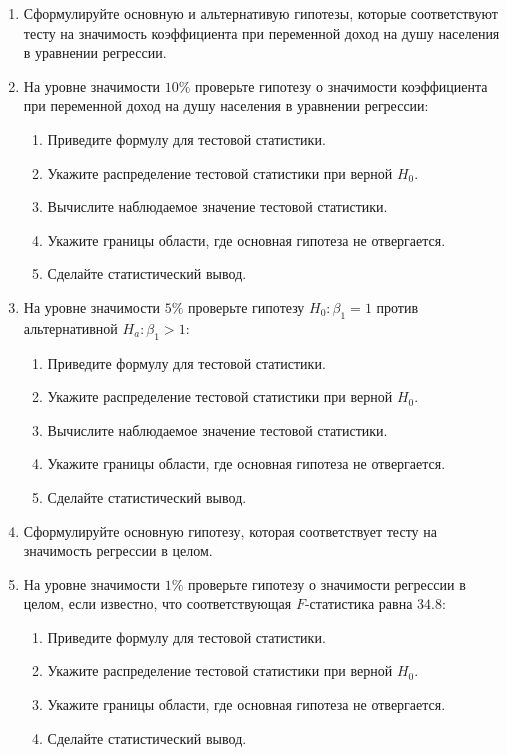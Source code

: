 \begin{problem}
\begin{enumerate}
\item Сформулируйте основную и альтернативую гипотезы, которые соответствуют тесту на значимость коэффициента при переменной доход на душу населения в уравнении регрессии.
\item На уровне значимости $10\%$ проверьте гипотезу о значимости коэффициента при переменной доход на душу населения в уравнении регрессии:
\begin{enumerate}
\item Приведите формулу для тестовой статистики.
\item Укажите распределение тестовой статистики при верной $H_0$.
\item Вычислите наблюдаемое значение тестовой статистики.
\item Укажите границы области, где основная гипотеза не отвергается.
\item Сделайте статистический вывод.
\end{enumerate}
\item На уровне значимости $5\%$ проверьте гипотезу $H_0: \beta_1 = 1$ против альтернативной $H_a: \beta_1 > 1$:
\begin{enumerate}
\item Приведите формулу для тестовой статистики.
\item Укажите распределение тестовой статистики при верной $H_0$.
\item Вычислите наблюдаемое значение тестовой статистики.
\item Укажите границы области, где основная гипотеза не отвергается.
\item Сделайте статистический вывод.
\end{enumerate}
\item Сформулируйте основную гипотезу, которая соответствует тесту на значимость регрессии в целом.
\item На уровне значимости $1\%$ проверьте гипотезу о значимости регрессии в целом, если известно, что соответствующая $F$-статистика равна $34.8$:
\begin{enumerate}
\item Приведите формулу для тестовой статистики.
\item Укажите распределение тестовой статистики  при верной $H_0$.
\item Укажите границы области, где основная гипотеза не отвергается.
\item Сделайте статистический вывод.
\end{enumerate}


\end{enumerate}
\end{problem}
